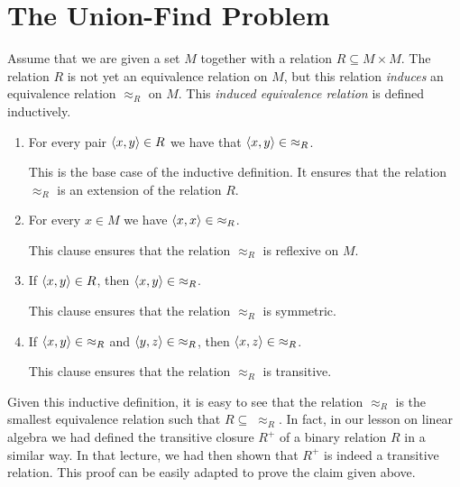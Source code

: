 \section{The Union-Find Problem}
Assume that we are given a set $M$ together with a relation $R \subseteq M \times M$.  The relation
$R$ is not yet an  equivalence relation on $M$, but this relation \emph{induces} an equivalence relation
$\approx_R$ on $M$.  This \emph{induced equivalence relation} is defined inductively.
\begin{enumerate}
\item For every pair $\pair(x,y) \in R$ we have that $\pair(x, y) \in\; \approx_R$.

      This is the base case of the inductive definition.  It ensures that the relation
      $\approx_R$ is an extension of the relation $R$.
\item For every $x \in M$ we have $\pair(x,x) \in\; \approx_R$.

      This clause ensures that the relation $\approx_R$ is reflexive on $M$.
\item If $\pair(x,y) \in R$, then $\pair(x,y) \in\; \approx_R$.

      This clause ensures that the relation $\approx_R$ is symmetric.
\item If $\pair(x,y) \in\; \approx_R$ and $\pair(y,z) \in\; \approx_R$, then $\pair(x,z) \in\; \approx_R$.

      This clause ensures that the relation $\approx_R$ is transitive.
\end{enumerate}
Given this inductive definition, it is easy to see that the relation $\approx_R$ is the smallest
equivalence relation such that $R \subseteq\; \approx_R$.  In fact, in our lesson on linear
algebra we had defined the transitive closure $R^+$ of a binary relation $R$ in a similar way.  In
that lecture, we had then shown that $R^+$ is indeed a transitive relation.  This proof can be
easily adapted to prove the claim given above.


